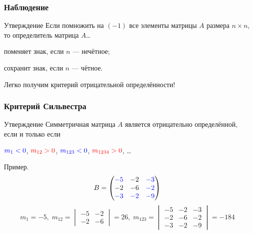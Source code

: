 \begin{frame}
    \frametitle{Наблюдение}

    \begin{block}{Утверждение}
    Если помножить на $(-1)$ все элементы матрицы $A$ размера $n\times n$, то определитель матрица $A$\ldots \pause

    поменяет знак, если $n$ — нечётное; \pause

    сохранит знак, если $n$ — чётное. 
    \end{block}

    \pause
    Легко получим критерий отрицательной определённости!


\end{frame}

    

\begin{frame}
\frametitle{Критерий Сильвестра}

\begin{block}{Утверждение}
    Симметричная матрица $A$ является отрицательно определённой, если и только если

    $\textcolor{blue}{m_1 < 0}$, $\textcolor{red}{m_{12} > 0}$, $\textcolor{blue}{m_{123} < 0}$, $\textcolor{red}{m_{1234}>0}$, \ldots   \pause   
\end{block}

Пример. 
\[
B = \begin{pmatrix}
    \textcolor{blue}{-5} & -2 & \textcolor{blue}{-3}  \\
    -2 & -6 & \textcolor{blue}{-2} \\
    \textcolor{blue}{-3} & \textcolor{blue}{-2} & \textcolor{blue}{-9} \\
\end{pmatrix}
\]
\[
    m_1 = -5, \; m_{12} = \begin{vmatrix}
        -5 & -2 \\
        -2 & -6
    \end{vmatrix} = 26, \; 
    m_{123} = \begin{vmatrix}
        -5 & -2 & -3 \\
        -2 & -6 & -2 \\
        -3 & -2 & -9
    \end{vmatrix}=  -184
\]



\end{frame}







